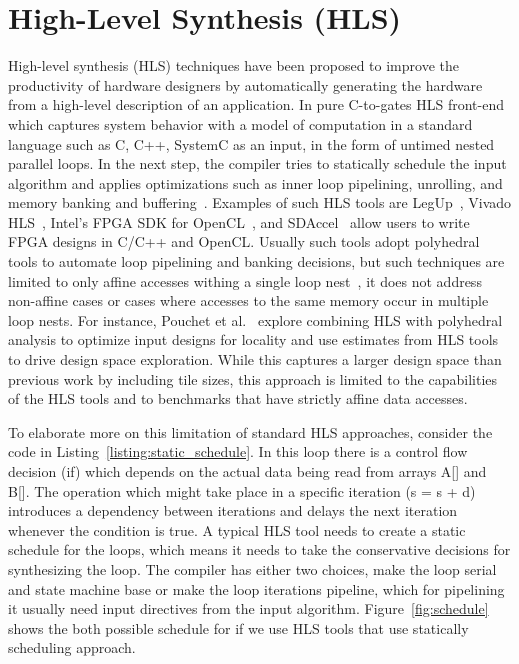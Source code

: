 \section{High-Level Synthesis (HLS)}

High-level synthesis (HLS) techniques have been proposed to improve the productivity of hardware designers by automatically generating the hardware from a high-level description of an application.
In pure C-to-gates HLS front-end which captures system behavior with a model of computation in a standard language such as C, C++, SystemC as an input, in the form of untimed nested parallel loops.
In the next step, the compiler tries to statically schedule the input algorithm and applies optimizations such as inner loop pipelining, unrolling, and memory banking and buffering~\cite{chung_micro_2010, lee_1989_new, paulin_1989_force}.
Examples of such HLS tools are LegUp~\cite{canis_2011_legup}, Vivado HLS~\cite{vivadohls}, Intel’s FPGA SDK for OpenCL~\cite{opencl_sdk}, and SDAccel~\cite{sdaccel} allow users to write FPGA designs in C/C++ and OpenCL.
Usually such tools adopt polyhedral tools to automate loop pipelining and banking decisions, but such techniques are limited to only affine accesses withing a single loop nest~\cite{wang_2014_theory}, it does not address non-affine cases or cases where accesses to the same memory occur in multiple loop nests.
For instance, Pouchet et al.~\cite{pouchet_2013_polyhedral}  explore combining HLS with polyhedral analysis to optimize input designs for locality and use estimates from HLS tools to drive design space exploration.
While this captures a larger design space than previous work by including tile sizes, this approach is limited to the capabilities of the HLS tools and to benchmarks that have strictly affine data accesses.

To elaborate more on this limitation of standard HLS approaches, consider the code in Listing~\ref{listing:static_schedule}.
In this loop there is a control flow decision (if) which depends on the actual data being read from arrays A[] and B[].
The operation which might take place in a specific iteration (s = s + d) introduces a dependency between iterations and delays the next iteration whenever the condition is true.
A typical HLS tool needs to create a static schedule for the loops, which means it needs to take the conservative decisions for synthesizing the loop. The compiler has either two choices, make the loop serial and state machine base or make the loop iterations pipeline, which for pipelining it usually need input directives from the input algorithm.
Figure~\ref{fig:schedule} shows the both possible schedule for if we use HLS tools that use statically scheduling approach.


